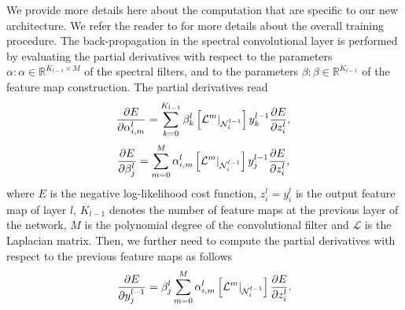 \documentclass[10pt,journal,compsoc]{IEEEtran}
\begin{document}
	We provide more details here about the computation that are specific to our new architecture. We refer the reader to \cite{bb:rumelhart1988learning} for more details about the overall training procedure. The back-propagation in the spectral convolutional layer is performed by evaluating the partial derivatives with respect to the parameters $\alpha: \alpha \in \mathbb{R}^{K_{l-1} \times M}$ of the spectral filters, and to the parameters $\beta: \beta \in \mathbb{R}^{K_{l-1}}$ of the feature map construction. The partial derivatives read
	\begin{equation}
	\frac{\partial E} {\partial \alpha^l_{i,m}} = \sum_{k=0}^{K_{l-1}} \beta_k^l \left[\mathcal{L}^m |_{\mathcal{N}_i^{l-1}}\right] y_{k}^{l-1} \frac{\partial E}{\partial z^{l}_i}, \\
	\label{eq:der1}
	\end{equation}
	\begin{equation}
	\frac{\partial E} {\partial \beta_j^l} =  \sum_{m=0}^M \alpha^l_{i,m} \left[\mathcal{L}^m |_{\mathcal{N}_i^{l-1}}\right] y_{j}^{l-1} \frac{\partial E}{\partial z^{l}_i}, \\
	\label{eq:der2}
	\end{equation}
	\noindent
	where $E$ is the negative log-likelihood cost function, $z^{l}_i=y^{l}_i$ is the output feature map of layer $l$, $K_{l-1}$ denotes the number of feature maps at the previous layer of the network, $M$ is the polynomial degree of the convolutional filter and $\mathcal{L}$ is the Laplacian matrix. Then, we further need to compute the partial derivatives with respect to the previous feature maps as follows
	\begin{equation}
	\frac{\partial E}{\partial y^{l-1}_j} = \beta_j^l \sum_{m=0}^M \alpha_{i,m}^l \left[\mathcal{L}^m |_{\mathcal{N}_i^{l-1}}\right] \frac{\partial E}{\partial z^{l}_i}. \\
	\label{eq:der_fm}
	\end{equation}
\end{document}
